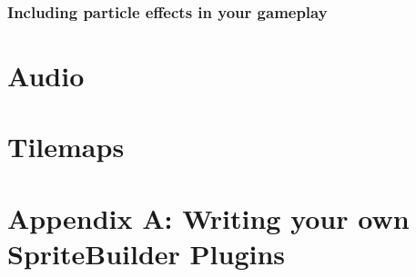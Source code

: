 \documentclass{scrreprt}
\begin{document}
\subsection{Including particle effects in your gameplay}
 

\chapter{Audio}

\chapter{Tilemaps}

\chapter{Appendix A: Writing your own SpriteBuilder Plugins}
\end{document}
